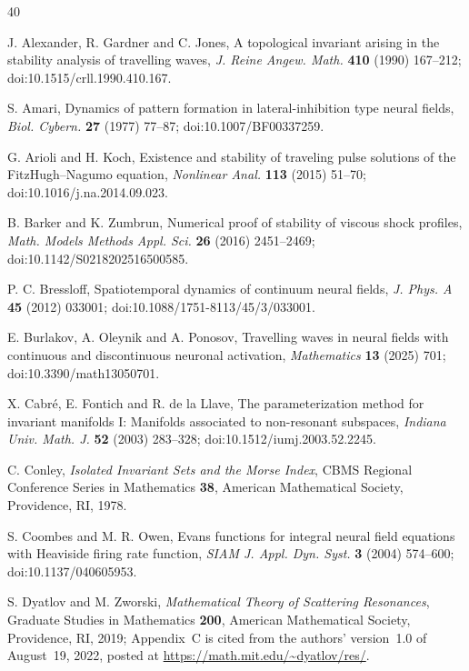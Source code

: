 \documentclass[11pt]{article}
\theoremstyle{definition}
\begin{document}
\begin{thebibliography}{40}
\small

 J. Alexander, R. Gardner and C. Jones, A topological invariant arising in the stability analysis of travelling waves, \emph{J. Reine Angew. Math.} \textbf{410} (1990) 167--212; doi:10.1515/crll.1990.410.167.

 S. Amari, Dynamics of pattern formation in lateral-inhibition type neural fields, \emph{Biol. Cybern.} \textbf{27} (1977) 77--87; doi:10.1007/BF00337259.

 G. Arioli and H. Koch, Existence and stability of traveling pulse solutions of the FitzHugh--Nagumo equation, \emph{Nonlinear Anal.} \textbf{113} (2015) 51--70; doi:10.1016/j.na.2014.09.023.

 B. Barker and K. Zumbrun, Numerical proof of stability of viscous shock profiles, \emph{Math. Models Methods Appl. Sci.} \textbf{26} (2016) 2451--2469; doi:10.1142/S0218202516500585.

 P. C. Bressloff, Spatiotemporal dynamics of continuum neural fields, \emph{J. Phys. A} \textbf{45} (2012) 033001; doi:10.1088/1751-8113/45/3/033001.

 E. Burlakov, A. Oleynik and A. Ponosov, Travelling waves in neural fields with continuous and discontinuous neuronal activation, \emph{Mathematics} \textbf{13} (2025) 701; doi:10.3390/math13050701.

 X. Cabr\'e, E. Fontich and R. de la Llave, The parameterization method for invariant manifolds I: Manifolds associated to non-resonant subspaces, \emph{Indiana Univ. Math. J.} \textbf{52} (2003) 283--328; doi:10.1512/iumj.2003.52.2245.

 C. Conley, \emph{Isolated Invariant Sets and the Morse Index}, CBMS Regional Conference Series in Mathematics \textbf{38}, American Mathematical Society, Providence, RI, 1978.

 S. Coombes and M. R. Owen, Evans functions for integral neural field equations with Heaviside firing rate function, \emph{SIAM J. Appl. Dyn. Syst.} \textbf{3} (2004) 574--600; doi:10.1137/040605953.

 S. Dyatlov and M. Zworski, \emph{Mathematical Theory of Scattering Resonances}, Graduate Studies in Mathematics \textbf{200}, American Mathematical Society, Providence, RI, 2019; Appendix~C is cited from the authors' version~1.0 of August~19, 2022, posted at \url{https://math.mit.edu/~dyatlov/res/}.


\end{thebibliography}
\end{document}
